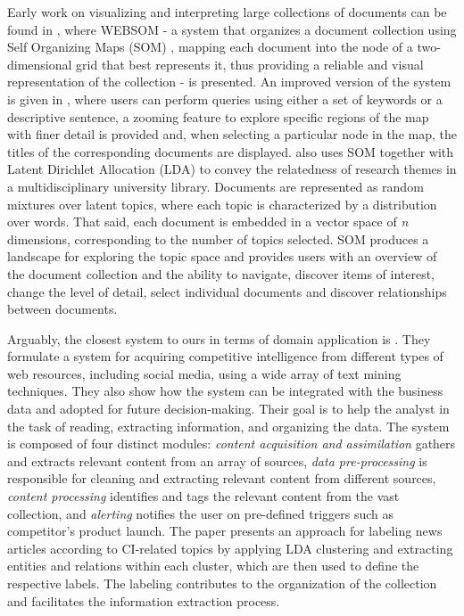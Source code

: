 \documentclass[a4paper]{article}
\begin{document}
Early work on visualizing and interpreting large collections of documents can be found in \citet{kaski1998}, where WEBSOM - a system that organizes a document collection using Self Organizing Maps (SOM) \citep{Kohonen1982}, mapping each document into the node of a two-dimensional grid that best represents it, thus providing a reliable and visual representation of the collection - is presented. An improved version of the system is given in \citet{kohonen2013}, where users can perform queries using either a set of keywords or a descriptive sentence, a zooming feature to explore specific regions of the map with finer detail is provided and, when selecting a particular node in the map, the titles of the corresponding documents are displayed. \citet{lafia2019} also uses SOM together with Latent Dirichlet Allocation (LDA) \citep{blei2003} to convey the relatedness of research themes in a multidisciplinary university library. Documents are represented as random mixtures over latent topics, where each topic is characterized by a distribution over words. That said, each document is embedded in a vector space of \emph{n} dimensions, corresponding to the number of topics selected. SOM produces a landscape for exploring the topic space and provides users with an overview of the document collection and the ability to navigate, discover items of interest, change the level of detail, select individual documents and discover relationships between documents.

Arguably, the closest system to ours in terms of domain application is \citet{dey2011}. They formulate a system for acquiring competitive intelligence from different types of web resources, including social media, using a wide array of text mining techniques. They also show how the system can be integrated with the business data and adopted for future decision-making. Their goal is to help the analyst in the task of reading, extracting information, and organizing the data. The system is composed of four distinct modules: \emph{content acquisition and assimilation} gathers and extracts relevant content from an array of sources, \emph{data pre-processing} is responsible for cleaning and extracting relevant content from different sources, \emph{content processing} identifies and tags the relevant content from the vast collection, and \emph{alerting} notifies the user on pre-defined triggers such as competitor's product launch. The paper presents an approach for labeling news articles according to CI-related topics by applying LDA clustering and extracting entities and relations within each cluster, which are then used to define the respective labels. The labeling contributes to the organization of the collection and facilitates the information extraction process.
\end{document}
